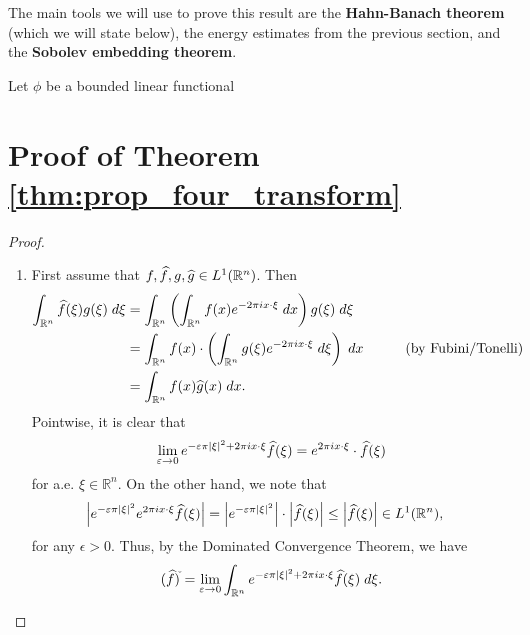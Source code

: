 \documentclass{article}
\numberwithin{equation}{section}
\begin{document}
	The main tools we will use to prove this result are the \textbf{Hahn-Banach theorem} (which we will state below), the energy estimates from the previous section, and the \textbf{Sobolev embedding theorem}. 
	\begin{theorem}
		Let $\phi$ be a bounded linear functional 
	\end{theorem}
	
	\newpage 
	\appendix 
	\section{Proof of Theorem \ref{thm:prop_four_transform}}
	\label{app:prop_four_transform}
	\begin{proof}
		\begin{enumerate}[itemsep =-2pt,label = (\arabic{*})]
			\item First assume that $f, \widehat{f}, g, \widehat{g} \in L^{1}(\mathbb{R}^{n})$. Then 
			\begin{align*}
				\begin{split}
					\int_{\mathbb{R}^{n}}\widehat{f}(\xi)g(\xi)\;d\xi &= \int_{\mathbb{R}^{n}}\left(\int_{\mathbb{R}^{n}}f(x)e^{-2\pi i x \cdot \xi}\;dx\right) g(\xi)\;d\xi \\
					&= \int_{\mathbb{R}^{n}}f(x) \cdot \left(\int_{\mathbb{R}^{n}}g(\xi)e^{-2\pi i x \cdot \xi} \;d\xi \right)\;dx \qquad \quad (\text{by Fubini/Tonelli}) \\
					&= \int_{\mathbb{R}^{n}}f(x)\widehat{g}(x)\;dx. 
				\end{split}
			\end{align*}
			Pointwise, it is clear that 
			\begin{equation*}
				\lim_{\varepsilon \to 0} e^{-\varepsilon\pi |\xi|^{2} + 2\pi i x \cdot \xi}\widehat{f}(\xi) = e^{2\pi i x \cdot \xi}\cdot \widehat{f}(\xi)
			\end{equation*}
			for a.e. $\xi \in \mathbb{R}^{n}$. On the other hand, we note that 
			\begin{align*}
				\begin{split}
					\left| e^{-\varepsilon \pi |\xi|^{2}}e^{2\pi i x \cdot \xi}\widehat{f}(\xi) \right| &= \left| e^{-\varepsilon \pi |\xi|^{2}} \right| \cdot \left| \widehat{f}(\xi) \right| \leq \left| \widehat{f}(\xi) \right| \in L^{1}(\mathbb{R}^{n}), 
				\end{split}
			\end{align*}
			for any $\epsilon > 0$. Thus, by the Dominated Convergence Theorem, we have 
			\begin{equation*}
				(\wh{f})^{\check{}} = \lim_{\epsilon \to 0}\int_{\mathbb{R}^{n}}e^{-\epsilon\pi |\xi|^{2} + 2\pi i x \cdot \xi}\wh{f}(\xi)\;d\xi. 

\end{equation*}
\end{enumerate}
\end{proof}
\end{document}
